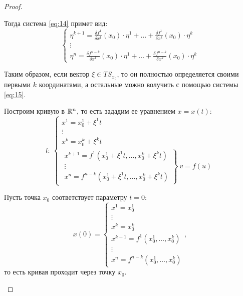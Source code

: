\begin{proof}
\begin{enumerate}
              Тогда система \ref{eq:14} примет вид:
              \begin{equation}\label{eq:15}
                  \left\{\begin{array}{l}
                      \eta^{k+1} = \frac{\delta f^1}{\delta x^1}(x_0) \cdot \eta^1 + \ldots + \frac{\delta f^1}{\delta x^k}(x_0)\cdot \eta^k \\
                      \vdots                                                                                                                 \\
                      \eta^{n} = \frac{\delta f^{n-k}}{\delta x^1}(x_0) \cdot \eta^1 + \ldots + \frac{\delta f^{n-k}}{\delta x^k}(x_0)\cdot \eta^k
                  \end{array}\right.
              \end{equation}

              Таким образом, если вектор $\xi \in TS_{x_0}$, то он полностью определяется своими первыми $k$ координатами, а остальные можно волучить с помощью системы \ref{eq:15}.

              Построим кривую в $\mathbb{R}^n$, то есть зададим ее уравнением $x = x(t)$:
              \begin{equation}\label{eq:16}
                  l: \ \left\{\begin{array}{l}
                      x^1 = x_0^1 + \xi^1t  \\
                      \vdots                \\
                      x^k = x_0^k + \xi^k t \\
                      \left.\begin{array}{l}
                                x^{k+1} = f^1(x_0^1 + \xi^1 t, \ldots, x_0^k + \xi^k t) \\
                                \vdots                                                  \\
                                x^{n} = f^{n-k}(x_0^1 + \xi^1 t, \ldots, x_0^k + \xi^k t)
                            \end{array}\right\} \ v = f(u)
                  \end{array}\right.
              \end{equation}

              Пусть точка $x_0$ соответствует параметру $t = 0$:
              \[
                  x(0) = \left\{\begin{array}{l}
                      x^1 = x_0^1                       \\
                      \vdots                            \\
                      x^k = x_0^k                       \\
                      x^{k+1} = f^1(x_0^1,\ldots,x_0^k) \\
                      \vdots                            \\
                      x^n = f^{n-k}(x_0^1, \ldots, x_0^k)
                  \end{array}\right.,
              \]
              то есть кривая проходит через точку $x_0$.


\end{enumerate}
\end{proof}
